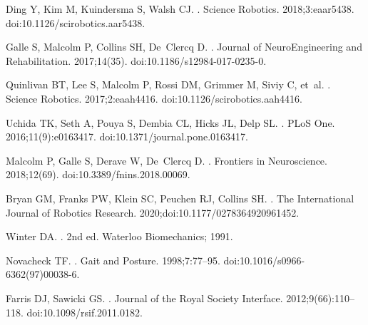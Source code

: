 \documentclass[10pt,letterpaper]{article}
\begin{document}
\begin{thebibliography}{10}
Ding Y, Kim M, Kuindersma S, Walsh CJ.
.
\newblock Science Robotics. 2018;3:eaar5438.
\newblock doi:{10.1126/scirobotics.aar5438}.

Galle S, Malcolm P, Collins SH, De~Clercq D.
.
\newblock Journal of NeuroEngineering and Rehabilitation. 2017;14(35).
\newblock doi:{10.1186/s12984-017-0235-0}.

Quinlivan BT, Lee S, Malcolm P, Rossi DM, Grimmer M, Siviy C, et~al.
.
\newblock Science Robotics. 2017;2:eaah4416.
\newblock doi:{10.1126/scirobotics.aah4416}.

Uchida TK, Seth A, Pouya S, Dembia CL, Hicks JL, Delp SL.
.
\newblock PLoS One. 2016;11(9):e0163417.
\newblock doi:{10.1371/journal.pone.0163417}.

Malcolm P, Galle S, Derave W, De~Clercq D.
.
\newblock Frontiers in Neuroscience. 2018;12(69).
\newblock doi:{10.3389/fnins.2018.00069}.

Bryan GM, Franks PW, Klein SC, Peuchen RJ, Collins SH.
.
\newblock The International Journal of Robotics Research.
  2020;doi:{10.1177/0278364920961452}.

Winter DA.
.
\newblock 2nd ed. Waterloo Biomechanics; 1991.

Novacheck TF.
.
\newblock Gait and Posture. 1998;7:77--95.
\newblock doi:{10.1016/s0966-6362(97)00038-6}.

Farris DJ, Sawicki GS.
.
\newblock Journal of the Royal Society Interface. 2012;9(66):110--118.
\newblock doi:{10.1098/rsif.2011.0182}.


\end{thebibliography}
\end{document}
